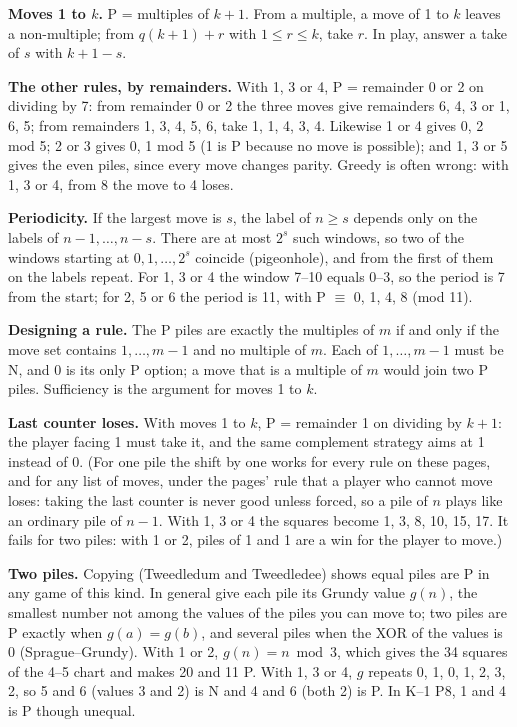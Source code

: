 \documentclass[10pt]{article}
\begin{document}
\textbf{Moves 1 to $k$.} P = multiples of $k+1$. From a multiple, a move of 1
to $k$ leaves a non-multiple; from $q(k+1)+r$ with $1 \le r \le k$, take $r$.
In play, answer a take of $s$ with $k+1-s$.

\textbf{The other rules, by remainders.} With 1, 3 or 4, P = remainder 0 or 2
on dividing by 7: from remainder 0 or 2 the three moves give remainders 6, 4,
3 or 1, 6, 5; from remainders 1, 3, 4, 5, 6, take 1, 1, 4, 3, 4. Likewise 1 or
4 gives 0, 2 mod 5; 2 or 3 gives 0, 1 mod 5 (1 is P because no move is
possible); and 1, 3 or 5 gives the even piles, since every move changes
parity. Greedy is often wrong: with 1, 3 or 4, from 8 the move to 4 loses.

\textbf{Periodicity.} If the largest move is $s$, the label of $n \ge s$
depends only on the labels of $n-1, \dots, n-s$. There are at most $2^s$ such
windows, so two of the windows starting at $0, 1, \dots, 2^s$ coincide
(pigeonhole), and from the first of them on the labels repeat. For 1, 3 or 4
the window 7--10 equals 0--3, so the period is 7 from the start; for 2, 5 or 6
the period is 11, with P $\equiv$ 0, 1, 4, 8 (mod 11).

\textbf{Designing a rule.} The P piles are exactly the multiples of $m$ if and
only if the move set contains $1, \dots, m-1$ and no multiple of $m$. Each of
$1, \dots, m-1$ must be N, and 0 is its only P option; a move that is a
multiple of $m$ would join two P piles. Sufficiency is the argument for moves
1 to $k$.

\textbf{Last counter loses.} With moves 1 to $k$, P = remainder 1 on dividing
by $k+1$: the player facing 1 must take it, and the same complement strategy
aims at 1 instead of 0. (For one pile the shift by one works for every rule
on these pages, and for any list of moves, under the pages' rule that a player
who cannot move loses: taking the last counter is never good unless forced,
so a pile of $n$ plays like an ordinary pile of $n-1$. With 1, 3 or 4 the
squares become 1, 3, 8, 10, 15, 17. It fails for two piles: with 1 or 2,
piles of 1 and 1 are a win for the player to move.)

\textbf{Two piles.} Copying (Tweedledum and Tweedledee) shows equal piles are
P in any game of this kind. In general give each pile its Grundy value $g(n)$,
the smallest number not among the values of the piles you can move to; two
piles are P exactly when $g(a) = g(b)$, and several piles when the XOR of the
values is 0 (Sprague--Grundy). With 1 or 2, $g(n) = n \bmod 3$, which gives the
34 squares of the 4--5 chart and makes 20 and 11 P. With 1, 3 or 4, $g$ repeats
0, 1, 0, 1, 2, 3, 2, so 5 and 6 (values 3 and 2) is N and 4 and 6 (both 2) is P.
In K--1 P8, 1 and 4 is P though unequal.
\end{document}
